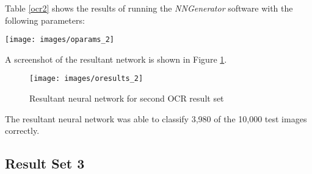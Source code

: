 Table \ref{ocr2} shows the results of running the {\it NNGenerator} software with the following parameters:

\begin{center}
\texttt{[image: images/oparams\_2]}
\end{center}

A screenshot of the resultant network is shown in Figure \ref{oresults_2}.

\begin{figure}[hbt!]
  \centering
  \texttt{[image: images/oresults\_2]}
  \caption{Resultant neural network for second OCR result set}
  \label{oresults_2}
\end{figure}

The resultant neural network was able to classify 3,980 of the 10,000
test images correctly.

\subsection{Result Set 3}

